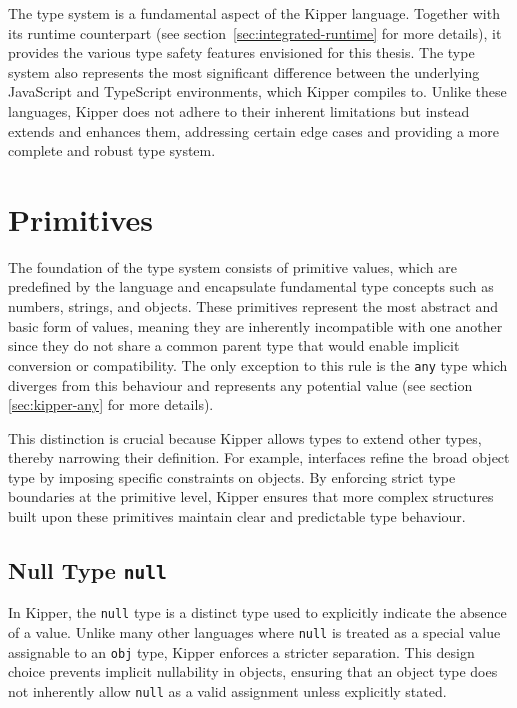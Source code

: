 
The type system is a fundamental aspect of the Kipper language. Together with its runtime counterpart (see section~\ref{sec:integrated-runtime} for more details), it provides the various type safety features envisioned for this thesis. The type system also represents the most significant difference between the underlying JavaScript and TypeScript environments, which Kipper compiles to. Unlike these languages, Kipper does not adhere to their inherent limitations but instead extends and enhances them, addressing certain edge cases and providing a more complete and robust type system.

\section{Primitives}
\label{sec:kipper-primitives}

The foundation of the type system consists of primitive values, which are predefined by the language and encapsulate fundamental type concepts such as numbers, strings, and objects. These primitives represent the most abstract and basic form of values, meaning they are inherently incompatible with one another since they do not share a common parent type that would enable implicit conversion or compatibility. The only exception to this rule is the \lstinline|any| type which diverges from this behaviour and represents any potential value (see section \ref{sec:kipper-any} for more details).

This distinction is crucial because Kipper allows types to extend other types, thereby narrowing their definition. For example, interfaces refine the broad object type by imposing specific constraints on objects. By enforcing strict type boundaries at the primitive level, Kipper ensures that more complex structures built upon these primitives maintain clear and predictable type behaviour.

\subsection{Null Type \lstinline|null|}

In Kipper, the \lstinline|null| type is a distinct type used to explicitly indicate the absence of a value. Unlike many other languages where \lstinline|null| is treated as a special value assignable to an \lstinline|obj| type, Kipper enforces a stricter separation. This design choice prevents implicit nullability in objects, ensuring that an object type does not inherently allow \lstinline|null| as a valid assignment unless explicitly stated.


